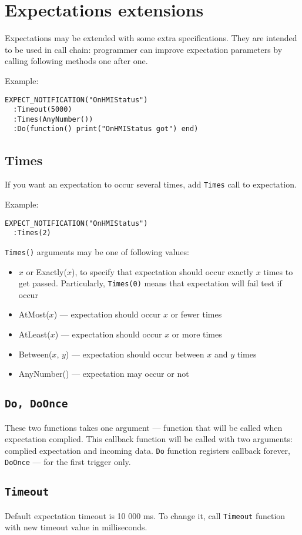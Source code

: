 \documentclass{article}
\begin{document}
\section{Expectations extensions}
Expectations may be extended with some extra specifications.
They are intended to be used in call chain: programmer can improve expectation
parameters by calling following methods one after one.

\noindent Example:
\begin{lstlisting}
EXPECT_NOTIFICATION("OnHMIStatus")
  :Timeout(5000)
  :Times(AnyNumber())
  :Do(function() print("OnHMIStatus got") end)
\end{lstlisting}
\subsection{Times}
If you want an expectation to occur several times, add {\tt Times} call
to expectation.

\noindent Example:
\begin{lstlisting}
EXPECT_NOTIFICATION("OnHMIStatus")
  :Times(2)
\end{lstlisting}
{\tt Times()} arguments may be one of following values:
\begin{itemize}
\item $x$ or Exactly($x$), to specify that expectation should occur exactly $x$
times to get passed.
Particularly, {\tt Times(0)} means that expectation will fail test if occur
\item AtMost($x$) --- expectation should occur $x$ or fewer times
\item AtLeast($x$) --- expectation should occur $x$ or more times
\item Between($x$, $y$) --- expectation should occur between $x$ and $y$ times
\item AnyNumber() --- expectation may occur or not
\end{itemize}
\subsection{\tt Do, DoOnce}
These two functions takes one argument --- function that will be called when
expectation complied.
This callback function will be called with two arguments: complied expectation
and incoming data.
{\tt Do} function registers callback forever, {\tt DoOnce} --- for the first
trigger only.
\subsection{\tt Timeout}
Default expectation timeout is 10 000 ms.
To change it, call {\tt Timeout} function with new timeout value in milliseconds.
\end{document}

